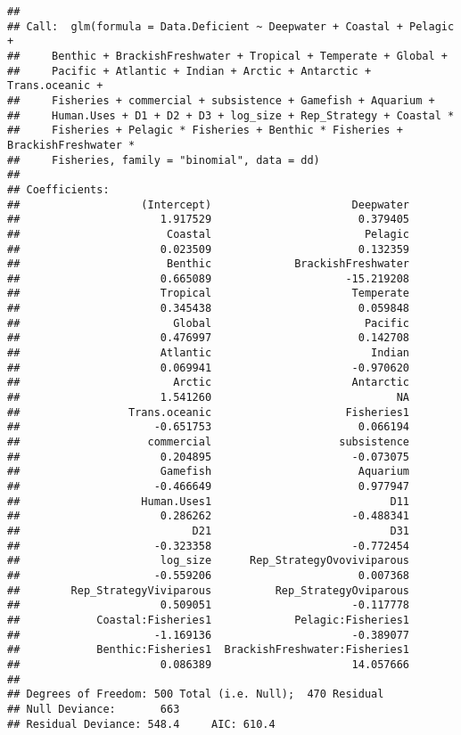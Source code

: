 \documentclass[]{article}
\begin{document}
\begin{verbatim}
## 
## Call:  glm(formula = Data.Deficient ~ Deepwater + Coastal + Pelagic + 
##     Benthic + BrackishFreshwater + Tropical + Temperate + Global + 
##     Pacific + Atlantic + Indian + Arctic + Antarctic + Trans.oceanic + 
##     Fisheries + commercial + subsistence + Gamefish + Aquarium + 
##     Human.Uses + D1 + D2 + D3 + log_size + Rep_Strategy + Coastal * 
##     Fisheries + Pelagic * Fisheries + Benthic * Fisheries + BrackishFreshwater * 
##     Fisheries, family = "binomial", data = dd)
## 
## Coefficients:
##                   (Intercept)                      Deepwater  
##                      1.917529                       0.379405  
##                       Coastal                        Pelagic  
##                      0.023509                       0.132359  
##                       Benthic             BrackishFreshwater  
##                      0.665089                     -15.219208  
##                      Tropical                      Temperate  
##                      0.345438                       0.059848  
##                        Global                        Pacific  
##                      0.476997                       0.142708  
##                      Atlantic                         Indian  
##                      0.069941                      -0.970620  
##                        Arctic                      Antarctic  
##                      1.541260                             NA  
##                 Trans.oceanic                     Fisheries1  
##                     -0.651753                       0.066194  
##                    commercial                    subsistence  
##                      0.204895                      -0.073075  
##                      Gamefish                       Aquarium  
##                     -0.466649                       0.977947  
##                   Human.Uses1                            D11  
##                      0.286262                      -0.488341  
##                           D21                            D31  
##                     -0.323358                      -0.772454  
##                      log_size      Rep_StrategyOvoviviparous  
##                     -0.559206                       0.007368  
##        Rep_StrategyViviparous          Rep_StrategyOviparous  
##                      0.509051                      -0.117778  
##            Coastal:Fisheries1             Pelagic:Fisheries1  
##                     -1.169136                      -0.389077  
##            Benthic:Fisheries1  BrackishFreshwater:Fisheries1  
##                      0.086389                      14.057666  
## 
## Degrees of Freedom: 500 Total (i.e. Null);  470 Residual
## Null Deviance:       663 
## Residual Deviance: 548.4     AIC: 610.4
\end{verbatim}
\end{document}
